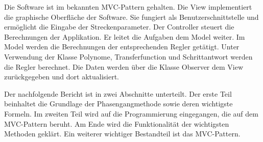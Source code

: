 Die Software ist im bekannten MVC-Pattern gehalten. Die View implementiert die graphische Oberfläche der Software. Sie fungiert als Benutzerschnittstelle und ermöglicht die Eingabe der Streckenparameter. Der Controller steuert die Berechnungen der Applikation. Er leitet die Aufgaben dem Model weiter. Im Model werden die Berechnungen der entsprechenden Regler getätigt. Unter Verwendung der Klasse Polynome, Transferfunction und Schrittantwort werden die Regler berechnet. Die Daten werden über die Klasse Observer dem View zurückgegeben und dort aktualisiert.

Der nachfolgende Bericht ist in zwei Abschnitte unterteilt. Der erste Teil beinhaltet die Grundlage der Phasengangmethode sowie deren wichtigste Formeln. Im zweiten Teil wird auf die Programmierung eingegangen, die auf dem MVC-Pattern beruht. Am Ende wird die Funktionalität der wichtigsten Methoden geklärt. Ein weiterer wichtiger Bestandteil ist das MVC-Pattern.
